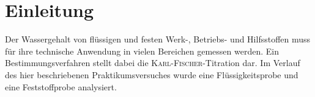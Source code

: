 %
\pagebreak
\section{Einleitung}
\label{sec:einleitung}
Der Wassergehalt von flüssigen und festen Werk-, Betriebs- und Hilfsstoffen muss für ihre technische Anwendung in vielen Bereichen gemessen werden. Ein Bestimmungsverfahren stellt dabei die \textsc{Karl-Fischer}-Titration dar. Im Verlauf des hier beschriebenen Praktikumsversuches wurde eine Flüssigkeitsprobe und eine Feststoffprobe analysiert.





